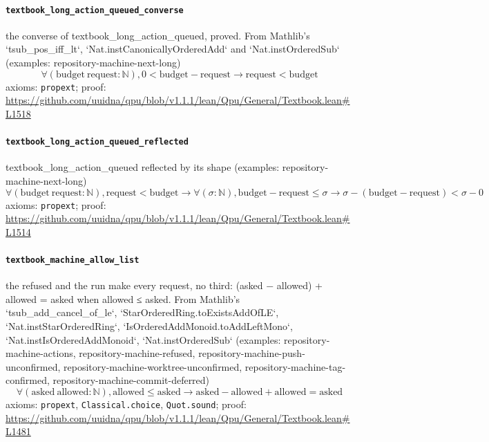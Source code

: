 \documentclass[11pt]{article}
\begin{document}
\paragraph{\texttt{textbook\_long\_action\_queued\_converse}}
the converse of textbook\_long\_action\_queued, proved. From Mathlib's `tsub\_pos\_iff\_lt`, `Nat.instCanonicallyOrderedAdd` and `Nat.instOrderedSub` (examples: repository-machine-next-long)
\[ \forall (\mathrm{budget}\ \mathrm{request} : \mathbb{N}), 0 < \mathrm{budget} - \mathrm{request} \to \mathrm{request} < \mathrm{budget} \]
\noindent axioms: \texttt{propext}; proof: \url{https://github.com/uuidna/qpu/blob/v1.1.1/lean/Qpu/General/Textbook.lean\#L1518}

\paragraph{\texttt{textbook\_long\_action\_queued\_reflected}}
textbook\_long\_action\_queued reflected by its shape (examples: repository-machine-next-long)
\[ \forall (\mathrm{budget}\ \mathrm{request} : \mathbb{N}), \mathrm{request} < \mathrm{budget} \to \forall (\sigma : \mathbb{N}), \mathrm{budget} - \mathrm{request} \le \sigma \to \sigma - (\mathrm{budget} - \mathrm{request}) < \sigma - 0 \]
\noindent axioms: \texttt{propext}; proof: \url{https://github.com/uuidna/qpu/blob/v1.1.1/lean/Qpu/General/Textbook.lean\#L1514}

\paragraph{\texttt{textbook\_machine\_allow\_list}}
the refused and the run make every request, no third: (asked − allowed) + allowed = asked when allowed ≤ asked. From Mathlib's `tsub\_add\_cancel\_of\_le`, `StarOrderedRing.toExistsAddOfLE`, `Nat.instStarOrderedRing`, `IsOrderedAddMonoid.toAddLeftMono`, `Nat.instIsOrderedAddMonoid`, `Nat.instOrderedSub` (examples: repository-machine-actions, repository-machine-refused, repository-machine-push-unconfirmed, repository-machine-worktree-unconfirmed, repository-machine-tag-confirmed, repository-machine-commit-deferred)
\[ \forall (\mathrm{asked}\ \mathrm{allowed} : \mathbb{N}), \mathrm{allowed} \le \mathrm{asked} \to \mathrm{asked} - \mathrm{allowed} + \mathrm{allowed} = \mathrm{asked} \]
\noindent axioms: \texttt{propext}, \texttt{Classical.choice}, \texttt{Quot.sound}; proof: \url{https://github.com/uuidna/qpu/blob/v1.1.1/lean/Qpu/General/Textbook.lean\#L1481}
\end{document}
